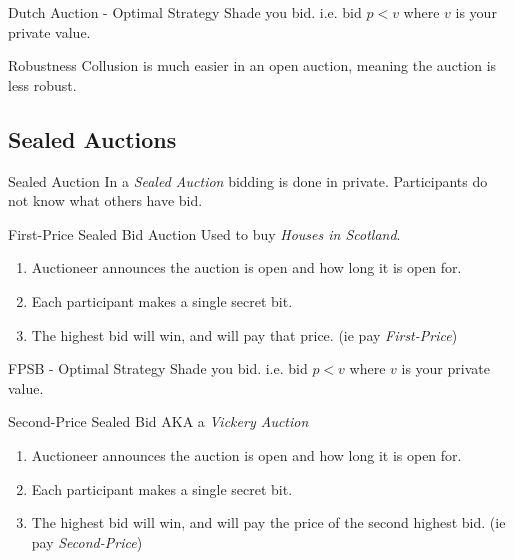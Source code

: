 \documentclass[11pt,a4paper]{article}
\begin{document}
\begin{proposition}{Dutch Auction - Optimal Strategy}
  Shade you bid. i.e. bid $p<v$ where $v$ is your private value.
\end{proposition}

\begin{remark}{Robustness}
  Collusion is much easier in an open auction, meaning the auction is less robust.
\end{remark}

\subsection{Sealed Auctions}

\begin{definition}{Sealed Auction}
  In a \textit{Sealed Auction} bidding is done in private. Participants do not know what others have bid.
\end{definition}

\begin{definition}{First-Price Sealed Bid Auction}
  Used to buy \textit{Houses in Scotland}.
  \begin{enumerate}
    \item Auctioneer announces the auction is open and how long it is open for.
    \item Each participant makes a single secret bit.
    \item The highest bid will win, and will pay that price. (ie pay \textit{First-Price})
  \end{enumerate}
\end{definition}

\begin{proposition}{FPSB - Optimal Strategy}
  Shade you bid. i.e. bid $p<v$ where $v$ is your private value.
\end{proposition}

\begin{definition}{Second-Price Sealed Bid}
  AKA a \textit{Vickery Auction}
  \begin{enumerate}
    \item Auctioneer announces the auction is open and how long it is open for.
    \item Each participant makes a single secret bit.
    \item The highest bid will win, and will pay the price of the second highest bid. (ie pay \textit{Second-Price})
  \end{enumerate}
\end{definition}
\end{document}
